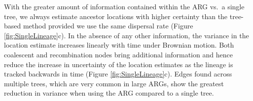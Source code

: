 

With the greater amount of information contained within the ARG vs.\ a single tree, we always estimate ancestor locations with higher certainty than the tree-based method provided we use the same dispersal rate (Figure \ref{fig:SingleLineage}c). In the absence of any other information, the variance in the location estimate increases linearly with time under Brownian motion. Both coalescent and recombination nodes bring additional information and hence reduce the increase in uncertainty of the location estimates as the lineage is tracked backwards in time (Figure \ref{fig:SingleLineage}c). Edges found across multiple trees, which are very common in large ARGs, show the greatest reduction in variance when using the ARG compared to a single tree.

